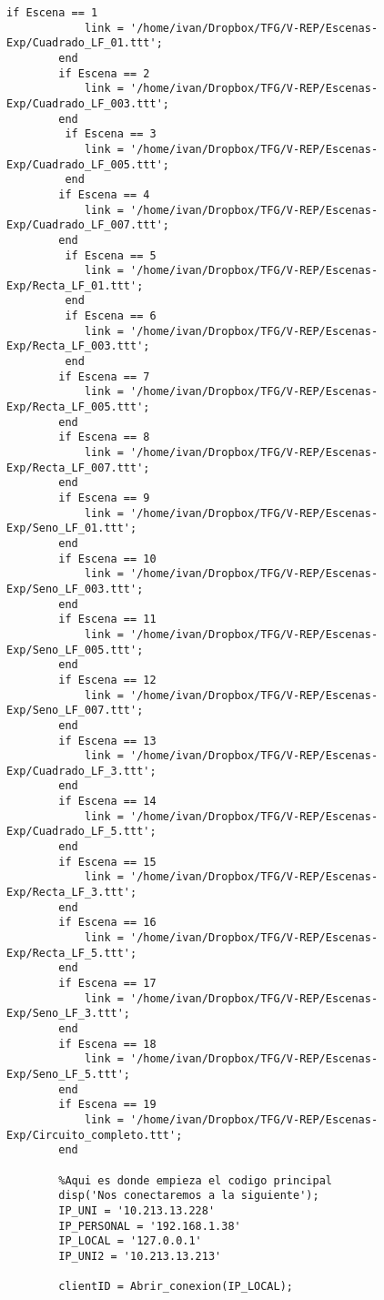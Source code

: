 \begin{lstlisting}[frame=single]
         if Escena == 1 
            link = '/home/ivan/Dropbox/TFG/V-REP/Escenas-Exp/Cuadrado_LF_01.ttt';
        end
        if Escena == 2
            link = '/home/ivan/Dropbox/TFG/V-REP/Escenas-Exp/Cuadrado_LF_003.ttt';
        end
         if Escena == 3
            link = '/home/ivan/Dropbox/TFG/V-REP/Escenas-Exp/Cuadrado_LF_005.ttt';
         end
        if Escena == 4 
            link = '/home/ivan/Dropbox/TFG/V-REP/Escenas-Exp/Cuadrado_LF_007.ttt';
        end
         if Escena == 5 
            link = '/home/ivan/Dropbox/TFG/V-REP/Escenas-Exp/Recta_LF_01.ttt';
         end
         if Escena == 6
            link = '/home/ivan/Dropbox/TFG/V-REP/Escenas-Exp/Recta_LF_003.ttt';
         end
        if Escena == 7
            link = '/home/ivan/Dropbox/TFG/V-REP/Escenas-Exp/Recta_LF_005.ttt';
        end
        if Escena == 8
            link = '/home/ivan/Dropbox/TFG/V-REP/Escenas-Exp/Recta_LF_007.ttt';
        end
        if Escena == 9
            link = '/home/ivan/Dropbox/TFG/V-REP/Escenas-Exp/Seno_LF_01.ttt';
        end
        if Escena == 10
            link = '/home/ivan/Dropbox/TFG/V-REP/Escenas-Exp/Seno_LF_003.ttt';
        end
        if Escena == 11
            link = '/home/ivan/Dropbox/TFG/V-REP/Escenas-Exp/Seno_LF_005.ttt';
        end
        if Escena == 12
            link = '/home/ivan/Dropbox/TFG/V-REP/Escenas-Exp/Seno_LF_007.ttt';
        end
        if Escena == 13
            link = '/home/ivan/Dropbox/TFG/V-REP/Escenas-Exp/Cuadrado_LF_3.ttt';
        end
        if Escena == 14
            link = '/home/ivan/Dropbox/TFG/V-REP/Escenas-Exp/Cuadrado_LF_5.ttt';
        end
        if Escena == 15
            link = '/home/ivan/Dropbox/TFG/V-REP/Escenas-Exp/Recta_LF_3.ttt';
        end
        if Escena == 16
            link = '/home/ivan/Dropbox/TFG/V-REP/Escenas-Exp/Recta_LF_5.ttt';
        end
        if Escena == 17
            link = '/home/ivan/Dropbox/TFG/V-REP/Escenas-Exp/Seno_LF_3.ttt';
        end
        if Escena == 18
            link = '/home/ivan/Dropbox/TFG/V-REP/Escenas-Exp/Seno_LF_5.ttt';
        end
        if Escena == 19
            link = '/home/ivan/Dropbox/TFG/V-REP/Escenas-Exp/Circuito_completo.ttt';
        end

        %Aqui es donde empieza el codigo principal
        disp('Nos conectaremos a la siguiente');
        IP_UNI = '10.213.13.228'
        IP_PERSONAL = '192.168.1.38'
        IP_LOCAL = '127.0.0.1'
        IP_UNI2 = '10.213.13.213'

        clientID = Abrir_conexion(IP_LOCAL);


\end{lstlisting}
